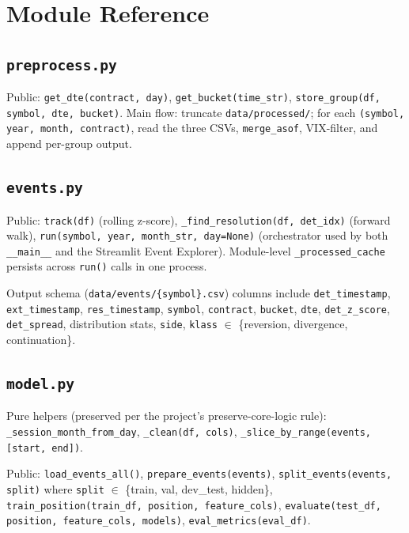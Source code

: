 \documentclass[11pt,a4paper]{article}
\begin{document}
\newpage

\section{Module Reference}

\subsection{\texttt{preprocess.py}}
Public: \texttt{get\_dte(contract, day)}, \texttt{get\_bucket(time\_str)}, \texttt{store\_group(df, symbol, dte, bucket)}. Main flow: truncate \texttt{data/processed/}; for each \texttt{(symbol, year, month, contract)}, read the three CSVs, \texttt{merge\_asof}, VIX-filter, and append per-group output.

\subsection{\texttt{events.py}}
Public: \texttt{track(df)} (rolling z-score), \texttt{\_find\_resolution(df, det\_idx)} (forward walk), \texttt{run(symbol, year, month\_str, day=None)} (orchestrator used by both \texttt{\_\_main\_\_} and the Streamlit Event Explorer). Module-level \texttt{\_processed\_cache} persists across \texttt{run()} calls in one process.

Output schema (\texttt{data/events/\{symbol\}.csv}) columns include \texttt{det\_timestamp}, \texttt{ext\_timestamp}, \texttt{res\_timestamp}, \texttt{symbol}, \texttt{contract}, \texttt{bucket}, \texttt{dte}, \texttt{det\_z\_score}, \texttt{det\_spread}, distribution stats, \texttt{side}, \texttt{klass} $\in$ \{reversion, divergence, continuation\}.

\subsection{\texttt{model.py}}
Pure helpers (preserved per the project's preserve-core-logic rule): \texttt{\_session\_month\_from\_day}, \texttt{\_clean(df, cols)}, \texttt{\_slice\_by\_range(events, [start, end])}.

Public: \texttt{load\_events\_all()}, \texttt{prepare\_events(events)}, \texttt{split\_events(events, split)} where \texttt{split} $\in$ \{train, val, dev\_test, hidden\}, \texttt{train\_position(train\_df, position, feature\_cols)}, \texttt{evaluate(test\_df, position, feature\_cols, models)}, \texttt{eval\_metrics(eval\_df)}.
\end{document}

